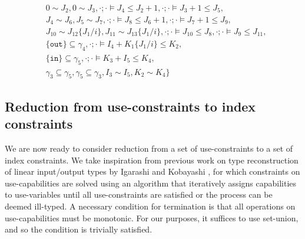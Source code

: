 \begin{exmp}
\begin{align*}
    & 0 \sim J_2, 0 \sim J_3,
    \cdot;\cdot\vDash J_4 \leq J_2+1, \cdot;\cdot\vDash J_3+1 \leq J_5 ,\\
    & J_4 \sim J_6, J_5 \sim J_7,
    \cdot;\cdot\vDash J_8 \leq J_6+1,\cdot;\cdot\vDash J_7+1 \leq J_9,\\
    & J_{10} \sim J_{12}\{J_1/i\}, J_{11} \sim J_{13}\{J_1/i\},
    \cdot;\cdot\vDash J_{10} \leq J_8, \cdot;\cdot\vDash J_9 \leq J_{11} , \\
    & \{\texttt{out}\} \subseteq \gamma_4,
    \cdot;\cdot\vDash I_4 + K_1\{J_1/i\} \leq K_2,\\
    & \{\texttt{in}\} \subseteq \gamma_5,\cdot;\cdot\vDash K_3 + I_5 \leq K_4,\\
    & \gamma_3 \subseteq \gamma_5, \gamma_5 \subseteq \gamma_3, I_3 \sim I_5,K_2 \sim K_4\}
\end{align*}
\end{exmp}
%
\subsection{Reduction from use-constraints to index constraints}

We are now ready to consider reduction from a set of use-constraints to a set of index constraints. We take inspiration from previous work on type reconstruction of linear input/output types by Igarashi and Kobayashi \cite{IgarashiKobayashi2000}, for which constraints on use-capabilities are solved using an algorithm that iteratively assigns capabilities to use-variables until all use-constraints are satisfied or the process can be deemed ill-typed. A necessary condition for termination is that all operations on use-capabilities must be monotonic. For our purposes, it suffices to use set-union, and so the condition is trivially satisfied.\\

